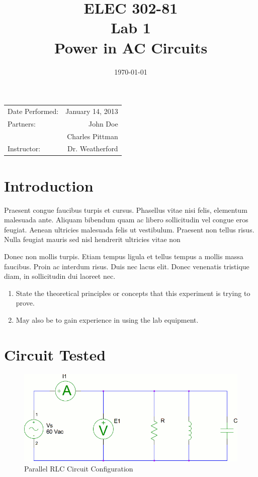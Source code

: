 \documentclass{article}
\title{ELEC 302-81\\ Lab 1\\ Power in AC Circuits} %
\date{\today} %
\begin{document}
\maketitle

\begin{center}
  \begin{tabular}{l r}
    Date Performed: & January 14, 2013 \\
    Partners: & John Doe \\
              & Charles Pittman \\
    Instructor: & Dr. Weatherford
  \end{tabular}
\end{center}

\pagebreak


\section{Introduction}
Praesent congue faucibus turpis et cursus. Phasellus vitae nisi felis,
elementum malesuada ante. Aliquam bibendum quam ac libero sollicitudin vel
congue eros feugiat. Aenean ultricies malesuada felis ut vestibulum. Praesent
non tellus risus. Nulla feugiat mauris sed nisl hendrerit ultricies vitae non

Donec non mollis turpis. Etiam tempus ligula et tellus tempus a mollis massa
faucibus. Proin ac interdum risus. Duis nec lacus elit. Donec venenatis
tristique diam, in sollicitudin dui laoreet nec.

\begin{enumerate}{}{}
\item State the theoretical principles or concepts that this experiment is
  trying to prove.
\item May also be to gain experience in using the lab equipment.
\end{enumerate}

\section{Circuit Tested}
\begin{figure}[h!]
  \begin{center}
    \includegraphics[width=.8\textwidth]{test_circuit}
    \caption{Parallel RLC Circuit Configuration}
    \label{test_circuit}
  \end{center}
\end{figure}
\end{document}
